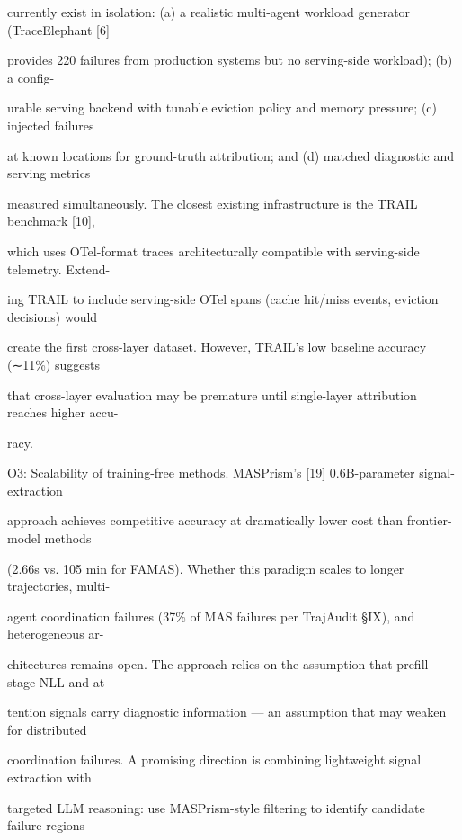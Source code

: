 \begin{flushleft}
\noindent currently exist in isolation: (a) a realistic multi-agent workload generator (TraceElephant [6]\par
\noindent provides 220 failures from production systems but no serving-side workload); (b) a config-\par
\noindent urable serving backend with tunable eviction policy and memory pressure; (c) injected failures\par
\noindent at known locations for ground-truth attribution; and (d) matched diagnostic and serving metrics\par
\noindent measured simultaneously. The closest existing infrastructure is the TRAIL benchmark [10],\par
\noindent which uses OTel-format traces architecturally compatible with serving-side telemetry. Extend-\par
\noindent ing TRAIL to include serving-side OTel spans (cache hit/miss events, eviction decisions) would\par
\noindent create the first cross-layer dataset. However, TRAIL’s low baseline accuracy (∼11\%) suggests\par
\noindent that cross-layer evaluation may be premature until single-layer attribution reaches higher accu-\par
\noindent racy.\par
\par\smallskip
\noindent O3: Scalability of training-free methods. MASPrism’s [19] 0.6B-parameter signal-extraction\par
\noindent approach achieves competitive accuracy at dramatically lower cost than frontier-model methods\par
\noindent (2.66s vs. 105 min for FAMAS). Whether this paradigm scales to longer trajectories, multi-\par
\noindent agent coordination failures (37\% of MAS failures per TrajAudit §IX), and heterogeneous ar-\par
\noindent chitectures remains open. The approach relies on the assumption that prefill-stage NLL and at-\par
\noindent tention signals carry diagnostic information — an assumption that may weaken for distributed\par
\noindent coordination failures. A promising direction is combining lightweight signal extraction with\par
\noindent targeted LLM reasoning: use MASPrism-style filtering to identify candidate failure regions\par

\end{flushleft}
